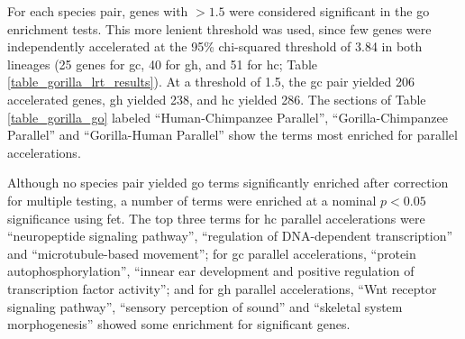 For each species pair, genes with \lrtmin$>1.5$ were considered
significant in the \ac{go} enrichment tests. This more lenient
threshold was used, since few genes were independently accelerated at
the 95\% chi-squared threshold of 3.84 in both lineages (25 genes for
\ac{gc}, 40 for \ac{gh}, and 51 for \ac{hc}; Table
\ref{table_gorilla_lrt_results}). At a \lrtmin threshold of 1.5, the
\ac{gc} pair yielded 206 accelerated genes, \ac{gh} yielded 238, and
\ac{hc} yielded 286. The sections of Table \ref{table_gorilla_go}
labeled ``Human-Chimpanzee Parallel'', ``Gorilla-Chimpanzee Parallel''
and ``Gorilla-Human Parallel'' show the terms most enriched for
parallel accelerations.

Although no species pair yielded \ac{go} terms significantly enriched
after correction for multiple testing, a number of terms were enriched
at a nominal $p<0.05$ significance using \ac{fet}. The top three terms
for \ac{hc} parallel accelerations were ``neuropeptide signaling
pathway'', ``regulation of DNA-dependent transcription'' and
``microtubule-based movement''; for \ac{gc} parallel accelerations,
``protein autophosphorylation'', ``innear ear development and positive
regulation of transcription factor activity''; and for \ac{gh}
parallel accelerations, ``Wnt receptor signaling pathway'', ``sensory
perception of sound'' and ``skeletal system morphogenesis'' showed
some enrichment for significant genes.

